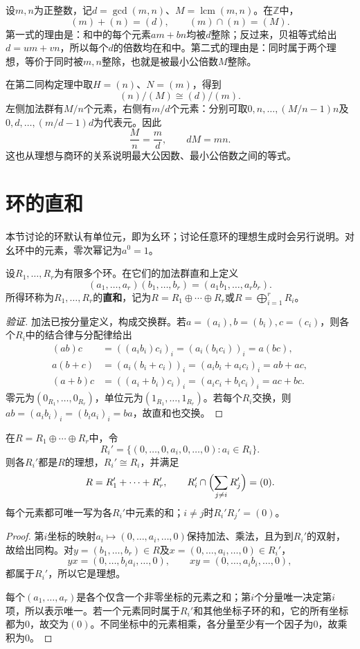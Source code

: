 \begin{example}
设$m,n$为正整数，记$d=\gcd(m,n)$、$M=\operatorname{lcm}(m,n)$。在$\mathbb Z$中，
\[
(m)+(n)=(d),\qquad(m)\cap(n)=(M).
\]
第一式的理由是：和中的每个元素$am+bn$均被$d$整除；反过来，贝祖等式给出$d=um+vn$，所以每个$d$的倍数均在和中。第二式的理由是：同时属于两个理想，等价于同时被$m,n$整除，也就是被最小公倍数$M$整除。

在第二同构定理中取$H=(n)$、$N=(m)$，得到
\[
(n)/(M)\cong(d)/(m).
\]
左侧加法群有$M/n$个元素，右侧有$m/d$个元素：分别可取$0,n,\ldots,(M/n-1)n$及$0,d,\ldots,(m/d-1)d$为代表元。因此
\[
\frac Mn=\frac md,\qquad dM=mn.
\]
这也从理想与商环的关系说明最大公因数、最小公倍数之间的等式。
\end{example}


\section{环的直和}

本节讨论的环默认有单位元，即为幺环；讨论任意环的理想生成时会另行说明。对幺环中的元素，零次幂记为$a^0=1$。

\begin{definition}
设$R_1,\ldots,R_r$为有限多个环。在它们的加法群直和上定义
\[
(a_1,\ldots,a_r)(b_1,\ldots,b_r)=(a_1b_1,\ldots,a_rb_r).
\]
所得环称为$R_1,\ldots,R_r$的\textbf{直和}，记为$R=R_1\oplus\cdots\oplus R_r$或$R=\bigoplus\limits_{i=1}^rR_i$。
\end{definition}
\begin{proof}[验证]
加法已按分量定义，构成交换群。若$a=(a_i),b=(b_i),c=(c_i)$，则各个$R_i$中的结合律与分配律给出
\begin{align*}
(ab)c&=((a_ib_i)c_i)_i=(a_i(b_ic_i))_i=a(bc),\\
a(b+c)&=(a_i(b_i+c_i))_i=(a_ib_i+a_ic_i)_i=ab+ac,\\
(a+b)c&=((a_i+b_i)c_i)_i=(a_ic_i+b_ic_i)_i=ac+bc.
\end{align*}
零元为$(0_{R_1},\ldots,0_{R_r})$，单位元为$(1_{R_1},\ldots,1_{R_r})$。若每个$R_i$交换，则$ab=(a_ib_i)_i=(b_ia_i)_i=ba$，故直和也交换。
\end{proof}

\begin{proposition}
在$R=R_1\oplus\cdots\oplus R_r$中，令
\[
R_i'=\{(0,\ldots,0,a_i,0,\ldots,0):a_i\in R_i\}.
\]
则各$R_i'$都是$R$的理想，$R_i'\cong R_i$，并满足
\[
R=R_1'+\cdots+R_r',\qquad
R_i'\cap\Bigl(\sum_{j\ne i}R_j'\Bigr)=(0).
\]
每个元素都可唯一写为各$R_i'$中元素的和；$i\ne j$时$R_i'R_j'=(0)$。
\end{proposition}
\begin{proof}
第$i$坐标的映射$a_i\mapsto(0,\ldots,a_i,\ldots,0)$保持加法、乘法，且为到$R_i'$的双射，故给出同构。对$y=(b_1,\ldots,b_r)\in R$及$x=(0,\ldots,a_i,\ldots,0)\in R_i'$，
\[
yx=(0,\ldots,b_ia_i,\ldots,0),\qquad
xy=(0,\ldots,a_ib_i,\ldots,0),
\]
都属于$R_i'$，所以它是理想。

每个$(a_1,\ldots,a_r)$是各个仅含一个非零坐标的元素之和；第$i$个分量唯一决定第$i$项，所以表示唯一。若一个元素同时属于$R_i'$和其他坐标子环的和，它的所有坐标都为0，故交为$(0)$。不同坐标中的元素相乘，各分量至少有一个因子为0，故乘积为0。
\end{proof}

